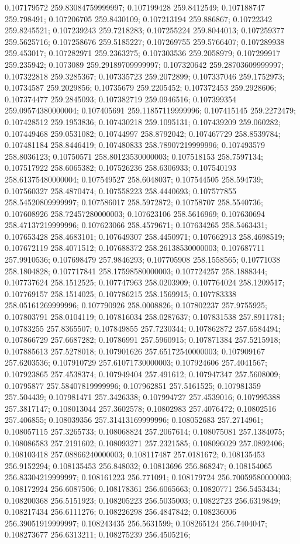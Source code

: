 0.107179572 259.83084759999997; 0.107199428 259.8412549; 0.107188747 259.798491; 0.107206705 259.8430109; 0.107213194 259.886867; 0.10722342 259.8245521; 0.107239243 259.7218283; 0.107255224 259.8044013; 0.107259377 259.5625716; 0.107258676 259.5185227; 0.107269755 259.5766407; 0.107289938 259.453017; 0.107282971 259.2363275; 0.107303536 259.2058979; 0.107299917 259.235942; 0.1073089 259.29189709999997; 0.107320642 259.28703609999997; 0.107322818 259.3285367; 0.107335723 259.2072899; 0.107337046 259.1752973; 0.10734587 259.2029856; 0.10735679 259.2205452; 0.107372453 259.2928606; 0.107374477 259.2845093; 0.107382719 259.0946516; 0.107399354 259.09574380000004; 0.107405691 259.11857119999996; 0.107415145 259.2272479; 0.107428512 259.1953836; 0.107430218 259.1095131; 0.107439209 259.060282; 0.107449468 259.0531082; 0.10744997 258.8792042; 0.107467729 258.8539784; 0.107481184 258.8446419; 0.107480833 258.78907219999996; 0.107493579 258.8036123; 0.10750571 258.80123530000003; 0.107518153 258.7597134; 0.107517922 258.6065382; 0.107526236 258.6306933; 0.107540193 258.61375480000004; 0.107549527 258.6048037; 0.107544505 258.594739; 0.107560327 258.4870474; 0.107558223 258.4440693; 0.107577855 258.54520809999997; 0.107586017 258.5972872; 0.10758707 258.5540736; 0.107608926 258.72457280000003; 0.107623106 258.5616969; 0.107630694 258.47137219999996; 0.107623066 258.4579671; 0.107634265 258.5463431; 0.107653428 258.4683101; 0.107649307 258.4450971; 0.107662913 258.4698519; 0.107672119 258.4071512; 0.107688372 258.26138530000003; 0.107687711 257.9910536; 0.107698479 257.9846293; 0.107705908 258.1558565; 0.10771038 258.1804828; 0.107717841 258.17598580000003; 0.107724257 258.1888344; 0.107737624 258.1512525; 0.107747963 258.0203909; 0.107764024 258.1209517; 0.107769157 258.1514025; 0.107786215 258.1569915; 0.107783338 258.05161269999996; 0.107790926 258.0008826; 0.107802237 257.9755925; 0.107803791 258.0104119; 0.107816034 258.0287637; 0.107831538 257.8911781; 0.10783255 257.8365507; 0.107849855 257.7230344; 0.107862872 257.6584494; 0.107866729 257.6687282; 0.10786991 257.5960915; 0.107871384 257.5215918; 0.107885613 257.5278018; 0.107901626 257.65172540000003; 0.107909167 257.6203536; 0.107910729 257.61071730000003; 0.107924606 257.4041567; 0.107923865 257.4538374; 0.107949404 257.491612; 0.107947347 257.5608009; 0.10795877 257.58407819999996; 0.107962851 257.5161525; 0.107981359 257.504439; 0.107981471 257.3426338; 0.107994727 257.4539016; 0.107995388 257.3817147; 0.108013044 257.3602578; 0.10802983 257.4076472; 0.10802516 257.406855; 0.108039356 257.31413169999996; 0.108052683 257.2714961; 0.108057115 257.3265733; 0.108068824 257.2067614; 0.108075081 257.1384075; 0.108086583 257.2191602; 0.108093271 257.2321585; 0.108096029 257.0892406; 0.108103418 257.08866240000003; 0.108117487 257.0181672; 0.108135453 256.9152294; 0.108135453 256.848032; 0.10813696 256.868247; 0.108154065 256.83304219999997; 0.108161223 256.771091; 0.108179724 256.70059580000003; 0.108172924 256.6087506; 0.108178361 256.6065663; 0.10820771 256.5453434; 0.108200368 256.5151923; 0.108205223 256.5035003; 0.10822723 256.6319849; 0.108217434 256.6111276; 0.108226298 256.4847842; 0.108236006 256.39051919999997; 0.108243435 256.5631599; 0.108265124 256.7404047; 0.108273677 256.6313211; 0.108275239 256.4505216; 